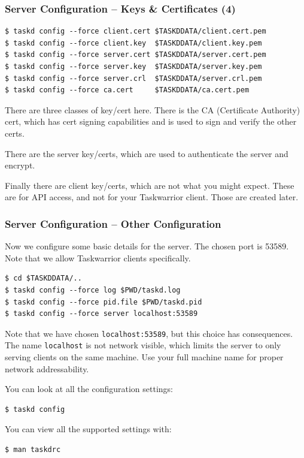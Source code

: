 \documentclass[t,handout]{beamer}
\begin{document}
\begin{frame}[fragile]\frametitle{Server Configuration -- Keys \& Certificates (4)}
    \vfill
    \begin{lstlisting}
$ taskd config --force client.cert $TASKDDATA/client.cert.pem
$ taskd config --force client.key  $TASKDDATA/client.key.pem
$ taskd config --force server.cert $TASKDDATA/server.cert.pem
$ taskd config --force server.key  $TASKDDATA/server.key.pem
$ taskd config --force server.crl  $TASKDDATA/server.crl.pem
$ taskd config --force ca.cert     $TASKDDATA/ca.cert.pem\end{lstlisting}

    There are three classes of key/cert here. There is the CA (Certificate Authority) cert, which has cert signing capabilities and is used to sign and verify the other certs.

    There are the server key/certs, which are used to authenticate the server and encrypt.

    Finally there are client key/certs, which are not what you might  expect. These are for API access, and not for your Taskwarrior client. Those are created later.
\end{frame}

\begin{frame}[fragile]\frametitle{Server Configuration -- Other Configuration}
    \vfill
    Now we configure some basic details for the server.  The chosen port is 53589. Note that we allow Taskwarrior clients specifically.

    \begin{lstlisting}
$ cd $TASKDDATA/..
$ taskd config --force log $PWD/taskd.log
$ taskd config --force pid.file $PWD/taskd.pid
$ taskd config --force server localhost:53589\end{lstlisting}

    Note that we have chosen \verb+localhost:53589+, but this choice has consequences. The name \verb+localhost+ is not network visible, which limits the server to only serving clients on the same machine. Use your full machine name for proper network addressability.

    You can look at all the configuration settings:

    \begin{lstlisting}
$ taskd config\end{lstlisting}

    You can view all the supported settings with:

    \begin{lstlisting}
$ man taskdrc\end{lstlisting}
\end{frame}
\end{document}
